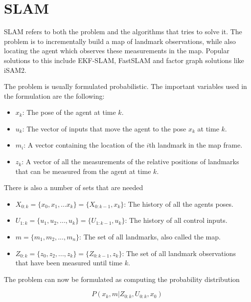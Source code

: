 \section{SLAM}

\gls{SLAM}\cite{FirstSLAMMention}\cite{SLAMIntro} refers to both the problem and the algorithms that tries to solve it. The problem is to incrementally build a map of landmark observations, while also locating the agent which observes these measurements in the map. Popular solutions to this include EKF-SLAM\cite{EKFSLAM}, FastSLAM\cite{FastSLAM1} and factor graph\cite{Dellaert} solutions like iSAM2\cite{iSAM2}.

The problem is usually formulated probabilistic. The important variables used in the formulation are the following:

\begin{itemize}
    \item $x_k$: The pose of the agent at time $k$. 
    \item $u_k$: The vector of inputs that move the agent to the pose $x_k$ at time $k$.
    \item $m_i$: A vector containing the location of the $i$th landmark in the map frame. 
    \item $z_k$: A vector of all the measurements of the relative positions of landmarks that can be measured from the agent at time $k$.
\end{itemize}

There is also a number of sets that are needed

\begin{itemize}
    \item $X_{0:k} = \{x_0,x_1,...x_k\} = \{X_{0:k-1},x_k\}$: The history of all the agents poses.
    \item $U_{1:k} = \{u_1,u_2,...,u_k\} = \{U_{1:k-1},u_k\}$: The history of all control inputs.
    \item $m=\{m_1,m_2,...,m_n\}$: The set of all landmarks, also called the map.
    \item $Z_{0:k}=\{z_0,z_2,...,z_k\} = \{Z_{0:k-1},z_k\}$: The set of all landmark observations that have been measured until time $k$.
\end{itemize}

The problem can now be formulated as computing the probability distribution 

\begin{equation}
    P(x_k,m|Z_{0:k},U_{0:k},x_0)
\end{equation}

